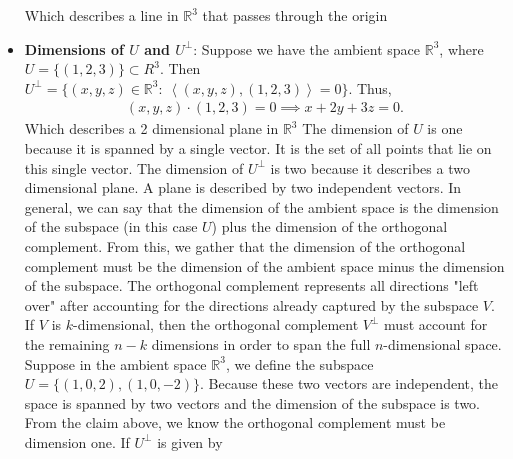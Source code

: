 \documentclass{report}
\begin{document}
\begin{itemize}
            Which describes a line  in $\mathbb{R}^{3}$ that passes through the origin
        \item \textbf{Dimensions of $U$ and $U^{\perp}$}: Suppose we have the ambient space $\mathbb{R}^{3}$, where $U = \{(1,2,3)\} \subset R^{3}$. Then $U^{\perp} = \{(x,y,z) \in \mathbb{R}^{3}:\ \left\langle (x,y,z), (1,2,3) \right\rangle = 0 \}$. Thus,
            \begin{align*}
                (x,y,z) \cdot (1,2,3) = 0 \implies x + 2y + 3z = 0
            .\end{align*}
            \bigbreak \noindent 
            Which describes a 2 dimensional plane in $\mathbb{R}^{3}$
            \bigbreak \noindent
            The dimension of $U$ is one because it is spanned by a single vector. It is the set of all points that lie on this single vector. The dimension of $U^{\perp}$ is two because it describes a two dimensional plane. A plane is described by two independent vectors. 
            \bigbreak \noindent 
            In general, we can say that the dimension of the ambient space is the dimension of the subspace (in this case $U$) plus the dimension of the orthogonal complement. From this, we gather that the dimension of the orthogonal complement must be the dimension of the ambient space minus the dimension of the subspace.
            \bigbreak \noindent 
            The orthogonal complement represents all directions "left over" after accounting for the directions already captured by the subspace \(V\). If \(V\) is \(k\)-dimensional, then the orthogonal complement \(V^\perp\) must account for the remaining \(n - k\) dimensions in order to span the full \(n\)-dimensional space.
            \bigbreak \noindent 
            Suppose in the ambient space $\mathbb{R}^{3}$, we define the subspace $U = \{(1,0,2), (1,0,-2)\}$. Because these two vectors are independent, the space is spanned by two vectors and the dimension of the subspace is two. From the claim above, we know the orthogonal complement must be dimension one. If $U^{\perp} $ is given by


\end{itemize}
\end{document}
